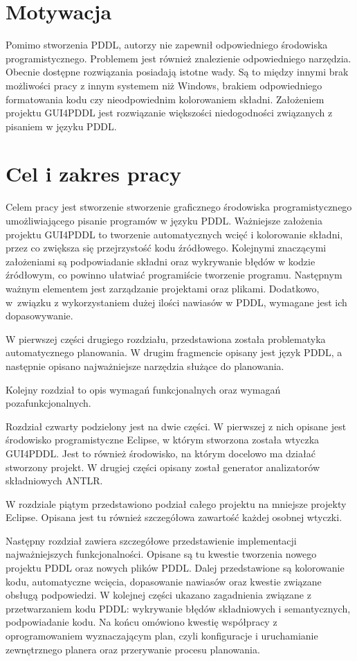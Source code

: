 \section{Motywacja}
Pomimo stworzenia PDDL, autorzy nie zapewnił odpowiedniego środowiska programistycznego. Problemem jest również znalezienie odpowiedniego narzędzia. Obecnie dostępne rozwiązania posiadają istotne wady. Są to między innymi brak możliwości pracy z innym systemem  niż Windows, brakiem odpowiedniego formatowania kodu czy nieodpowiednim kolorowaniem składni. Założeniem projektu GUI4PDDL jest rozwiązanie większości niedogodności związanych z pisaniem w języku PDDL.
\section{Cel i zakres pracy}
Celem pracy jest stworzenie stworzenie graficznego środowiska programistycznego umożliwiającego pisanie programów w języku PDDL. Ważniejsze założenia projektu GUI4PDDL to tworzenie automatycznych wcięć i kolorowanie składni, przez co zwiększa się przejrzystość kodu źródłowego. Kolejnymi znaczącymi założeniami są podpowiadanie składni oraz wykrywanie błędów w kodzie źródłowym, co powinno ułatwiać programiście tworzenie programu. Następnym ważnym elementem jest zarządzanie projektami oraz plikami. Dodatkowo, w~związku z wykorzystaniem dużej ilości nawiasów w PDDL, wymagane jest ich dopasowywanie. 

W pierwszej części drugiego rozdziału, przedstawiona została problematyka automatycznego planowania. W drugim fragmencie opisany jest język PDDL, a następnie opisano najważniejsze narzędzia służące do planowania.

Kolejny rozdział to opis wymagań funkcjonalnych oraz wymagań pozafunkcjonalnych.

Rozdział czwarty podzielony jest na dwie części. W pierwszej z nich opisane jest środowisko programistyczne Eclipse, w którym stworzona została wtyczka GUI4PDDL. Jest to również środowisko, na którym docelowo ma działać stworzony projekt. W drugiej części opisany został generator analizatorów składniowych ANTLR.

W rozdziale piątym przedstawiono podział całego projektu na mniejsze projekty Eclipse. Opisana jest tu również szczegółowa zawartość każdej osobnej wtyczki.

Następny rozdział zawiera szczegółowe przedstawienie implementacji najważniejszych funkcjonalności. Opisane są tu kwestie tworzenia nowego projektu PDDL oraz nowych plików PDDL. Dalej przedstawione są kolorowanie kodu, automatyczne wcięcia, dopasowanie nawiasów oraz kwestie związane obsługą podpowiedzi. W kolejnej części ukazano zagadnienia związane z przetwarzaniem kodu PDDL: wykrywanie błędów składniowych i semantycznych, podpowiadanie kodu. Na końcu omówiono kwestię współpracy z oprogramowaniem wyznaczającym plan, czyli konfiguracje i uruchamianie zewnętrznego planera oraz przerywanie procesu planowania.

